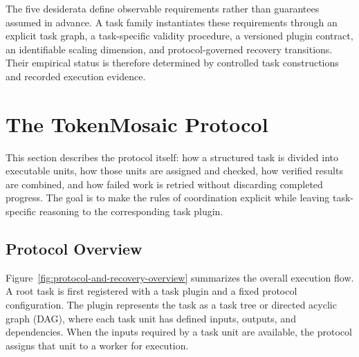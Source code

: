 \documentclass{article}
\theoremstyle{plain}
\begin{document}
The five desiderata define observable requirements rather than guarantees
assumed in advance. A task family instantiates these requirements through
an explicit task graph, a task-specific validity procedure, a versioned
plugin contract, an identifiable scaling dimension, and protocol-governed
recovery transitions. Their empirical status is therefore determined by
controlled task constructions and recorded execution evidence.



\section{The TokenMosaic Protocol}
\label{sec:tokenmosaic-protocol}

This section describes the protocol itself: how a structured task is divided into executable units, how those units are assigned and checked, how verified results are combined, and how failed work is retried without discarding completed progress. The goal is to make the rules of coordination explicit while leaving task-specific reasoning to the corresponding task plugin.

\subsection{Protocol Overview}
\label{subsec:protocol-and-recovery-overview}

Figure~\ref{fig:protocol-and-recovery-overview} summarizes the overall execution flow. A root task is first registered with a task plugin and a fixed protocol configuration. The plugin represents the task as a task tree or directed acyclic graph (DAG), where each task unit has defined inputs, outputs, and dependencies. When the inputs required by a task unit are available, the protocol assigns that unit to a worker for execution.
\end{document}
